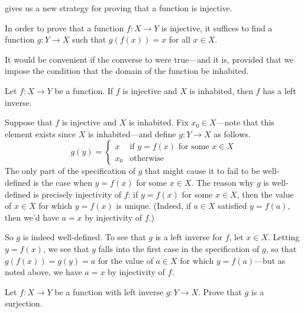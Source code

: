  gives us a new strategy for proving that a function is injective.

\begin{strategy}
In order to prove that a function $f : X \to Y$ is injective, it suffices to find a function $g : Y \to X$ such that $g(f(x)) = x$ for all $x \in X$.
\end{strategy}

It would be convenient if the converse to  were true---and it is, provided that we impose the condition that the domain of the function be inhabited.

\begin{proposition}
\label{propIfInjectiveThenHasLeftInverse}
Let $f : X \to Y$ be a function. If $f$ is injective and $X$ is inhabited, then $f$ has a left inverse.
\end{proposition}

\begin{cproof}
Suppose that $f$ is injective and $X$ is inhabited. Fix $x_0 \in X$---note that this element exists since $X$ is inhabited---and define $g : Y \to X$ as follows.
\[ g(y) = \begin{cases} x & \text{if } y=f(x) \text{ for some } x \in X \\ x_0 & \text{otherwise} \end{cases} \]
The only part of the specification of $g$ that might cause it to fail to be well-defined is the case when $y=f(x)$ for some $x \in X$. The reason why $g$ is well-defined is precisely injectivity of $f$: if $y=f(x)$ for some $x \in X$, then the value of $x \in X$ for which $y = f(x)$ is unique. (Indeed, if $a \in X$ satisfied $y=f(a)$, then we'd have $a=x$ by injectivity of $f$.)

So $g$ is indeed well-defined. To see that $g$ is a left inverse for $f$, let $x \in X$. Letting $y = f(x)$, we see that $y$ falls into the first case in the specification of $g$, so that $g(f(x)) = g(y) = a$ for the value of $a \in X$ for which $y = f(a)$---but as noted above, we have $a=x$ by injectivity of $f$.
\end{cproof}

\begin{exercise}
Let $f : X \to Y$ be a function with left inverse $g : Y \to X$. Prove that $g$ is a surjection.
\end{exercise}

